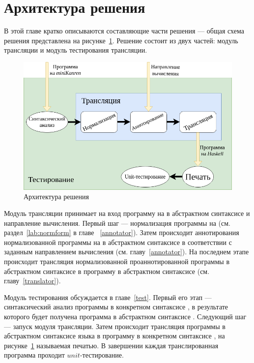 \section{Архитектура решения}
\label{arch}

В этой главе кратко описываются составляющие части решения --- общая схема решения представлена на рисунке~\ref{bl:general}.
Решение состоит из двух частей: модуль трансляции и модуль тестирования трансляции.

\begin{figure}[h!]
  \begin{center}
    \includegraphics[width=\textwidth]{figures/diagram.png}
  \end{center}
  \caption{Архитектура решения}
  \label{bl:general}
\end{figure}

Модуль трансляции принимает на вход программу на \miniKanren{} в абстрактном синтаксисе и направление вычисления.
Первый шаг --- нормализация программы на \miniKanren{} (см. раздел~\ref{lab:normform} в главе ~\ref{annotator}).
Затем происходит аннотирования нормализованной программы на \miniKanren{} в абстрактном синтаксисе в соответствии с заданным направлением вычисления (см. главу~\ref{annotator}).
На последнем этапе происходит трансляция нормализованной проаннотированной программы в абстрактном синтаксисе \miniKanren{} в программу в абстрактном синтаксисе \haskell{} (см. главу~\ref{translator}).

Модуль тестирования обсуждается в главе~\ref{test}.
Первый его этап --- синтаксический анализ программы в конкретном синтаксисе \miniKanren{}, в результате которого будет получена программа в абстрактном синтаксисе \miniKanren{}.
Следующий шаг --- запуск модуля трансляции.
Затем происходит трансляция программы в абстрактном синтаксисе языка \haskell{} в программу в конкретном синтаксисе \haskell{}, на рисунке~\ref{bl:general} называемая печатью.
В завершении каждая транслированная программа проходит $unit$-тестирование.


